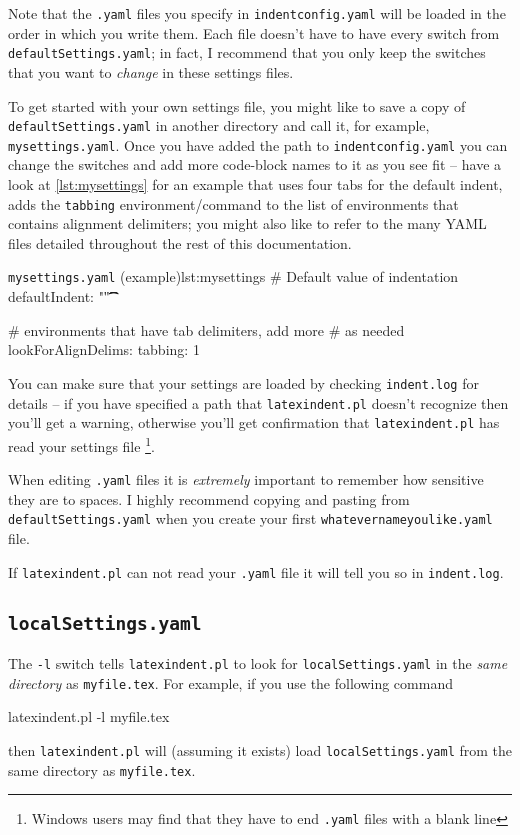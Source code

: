 	Note that the \texttt{.yaml} files you specify in \texttt{indentconfig.yaml}
	will be loaded in the order in which you write them. Each file doesn't have
	to have every switch from \texttt{defaultSettings.yaml}; in fact, I recommend
	that you only keep the switches that you want to \emph{change} in these
	settings files.

	To get started with your own settings file, you might like to save a copy of
	\texttt{defaultSettings.yaml} in another directory and call it, for
	example, \texttt{mysettings.yaml}. Once you have added the path to \texttt{indentconfig.yaml}
	you can change the switches and add more code-block names to it
	as you see fit -- have a look at \cref{lst:mysettings} for an example
	that uses four tabs for the default indent, adds the \texttt{tabbing}
	environment/command to the list of environments that contains alignment delimiters; you might also like to
	refer to the many YAML files detailed throughout the rest of this documentation.

	\begin{yaml}{\texttt{mysettings.yaml} (example)}{lst:mysettings}
# Default value of indentation
defaultIndent: "\t\t\t\t"

# environments that have tab delimiters, add more
# as needed
lookForAlignDelims:
    tabbing: 1
\end{yaml}

	You can make sure that your settings are loaded by checking \texttt{indent.log}
	for details -- if you have specified a path that \texttt{latexindent.pl} doesn't
	recognize then you'll get a warning, otherwise you'll get confirmation that
	\texttt{latexindent.pl} has read your settings file \footnote{Windows users
		may find that they have to end \texttt{.yaml} files with a blank line}.

	\begin{warning}
		When editing \texttt{.yaml} files it is \emph{extremely} important
		to remember how sensitive they are to spaces. I highly recommend copying
		and pasting from \texttt{defaultSettings.yaml} when you create your
		first \texttt{whatevernameyoulike.yaml} file.

		If \texttt{latexindent.pl} can not read your \texttt{.yaml} file it
		will tell you so in \texttt{indent.log}.
	\end{warning}

\subsection{\texttt{localSettings.yaml}}\label{sec:localsettings}
	The \texttt{-l} switch tells \texttt{latexindent.pl} to look for \texttt{localSettings.yaml} in the
	\emph{same directory} as \texttt{myfile.tex}.  For example, if you use the following command
	\begin{commandshell}
latexindent.pl -l myfile.tex
\end{commandshell}
	then \texttt{latexindent.pl} will (assuming it exists) load \texttt{localSettings.yaml} from the same directory
	as \texttt{myfile.tex}.

